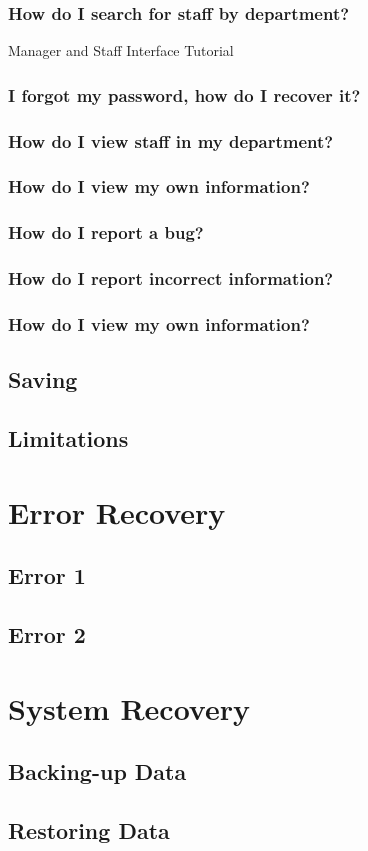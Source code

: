 \subsubsection{How do I search for staff by department?}

Manager and Staff Interface Tutorial

\subsubsection{I forgot my password, how do I recover it?}

\subsubsection{How do I view staff in my department?}

\subsubsection{How do I view my own information?}

\subsubsection{How do I report a bug?}

\subsubsection{How do I report incorrect information?}

\subsubsection{How do I view my own information?}

\subsection{Saving}

\subsection{Limitations}

\section{Error Recovery}

\subsection{Error 1}

\subsection{Error 2}

\section{System Recovery}

\subsection{Backing-up Data}

\subsection{Restoring Data}